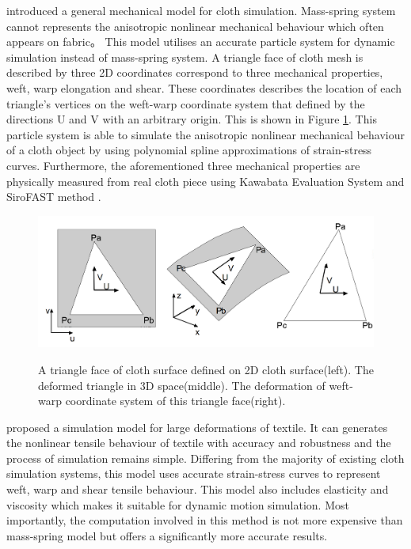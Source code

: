  introduced a general mechanical model for cloth simulation.  Mass-spring system cannot represents the anisotropic nonlinear mechanical behaviour which often appears on fabric。 This model utilises an accurate particle system for dynamic simulation instead of mass-spring system. A triangle face of cloth mesh is described by three 2D coordinates correspond to three mechanical properties, weft, warp elongation and shear. These coordinates describes the location of each triangle's vertices on the weft-warp coordinate system that defined by the directions U and V with an arbitrary origin. This is shown in Figure \ref{figure:Volino2005}. This particle system is able to simulate the anisotropic nonlinear mechanical behaviour of a cloth object by using polynomial spline approximations of strain-stress curves. Furthermore, the aforementioned three mechanical properties are physically measured from real cloth piece using Kawabata Evaluation System  and SiroFAST method . 

\begin{figure}[ht]
    \centering
	\includegraphics[width=0.7\columnwidth]{../images/Volino2005}\\[1cm]
    \caption[2D coordinates on triangle]{A triangle face of cloth surface defined on  2D cloth surface(left). The deformed triangle in 3D space(middle). The deformation of weft-warp coordinate system of this triangle face(right).}
    \label{figure:Volino2005}
\end{figure}


 proposed a simulation model for large deformations of textile. It can generates the nonlinear tensile behaviour of textile with accuracy and robustness and the process of simulation remains simple. Differing from the majority of existing cloth simulation systems, this model uses accurate strain-stress curves to represent weft, warp and shear tensile behaviour. This model also includes elasticity and viscosity which makes it suitable for dynamic motion simulation. Most importantly, the computation involved in this method is not more expensive than mass-spring model but offers a significantly more accurate results.

